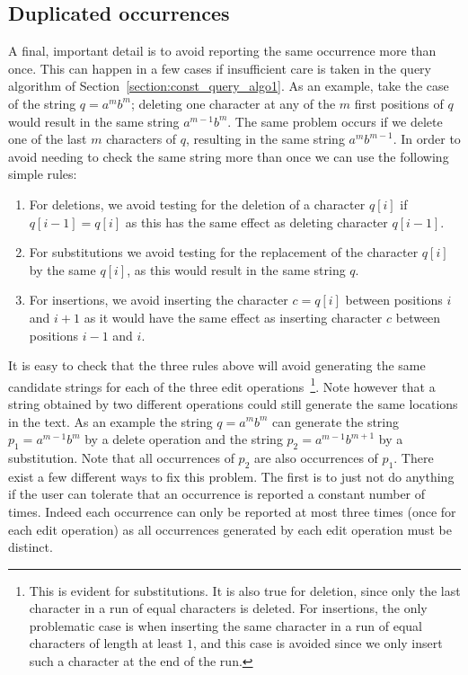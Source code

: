 \documentclass{article}
\newcommand{\?}{\mskip1.5mu}
\begin{document}
\subsection{Duplicated occurrences}
\label{subsec:dupl_occ}
A final, important detail is to avoid reporting the same occurrence more than once. This can happen in a few cases if insufficient care is taken in the query algorithm of Section~\ref{section:const_query_algo1}. As an example, take the case of the string $q=a^mb^m$; deleting one character at any of the $m$ first positions of $q$ would result in the same string $a^{m-1}b^m$. The same problem occurs if we delete one of the last $m$ characters of $q$, resulting in the same string $a^mb^{m-1}$. 
In order to avoid needing to check the same string more than once we can use the following simple rules: 
\begin{enumerate}
\item For deletions, we avoid testing for the deletion of a character $q[i]$ if $q[i-1]=q[i]$ as this has the same effect as deleting character $q[i-1]$. 
\item For substitutions we avoid testing for the replacement of the character $q[i]$ by the same $q[i]$, as this would result in the same string $q$. 
\item For insertions, we avoid inserting the character $c=q[i]$ between positions $i$ and $i+1$ as it would have the same effect as inserting character $c$ between positions $i-1$ and $i$. 
\end{enumerate}
It is easy to check that the three rules above will avoid generating the same candidate strings for each of the three edit operations~\footnote{This is evident for substitutions. It is also true for deletion, since only the last character in a run of equal characters is deleted. For insertions, the only problematic case is when inserting the same character in a run of equal characters of length at least $1$, and this case is  avoided since we only insert such a character at the end of the run.}. Note however that a string obtained by two different operations could still generate the same locations in the text. As an example the string $q=a^mb^m$ can generate the string $p_1=a^{m-1}b^m$ by a delete operation and the string $p_2=a^{m-1}b^{m+1}$ by a substitution. Note that all occurrences of $p_2$ are also occurrences of $p_1$. 
There exist a few different ways to fix this problem. The first is to just not do anything if the user can tolerate that an occurrence is reported a constant number of times. Indeed each occurrence can only be reported at most three times (once for each edit operation) as all occurrences generated by each edit operation must be distinct. 
\end{document}
